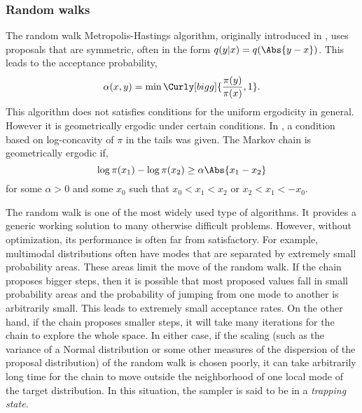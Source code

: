 \subsubsection{Random walks}
\label{ssub:Random walks}

The random walk Metropolis-Hastings algorithm, originally introduced in
\cite{Metropolis:1953ex}, uses proposals that are symmetric, often in the form
$q(y|x) = q(\Abs{y - x})$. This leads to the acceptance probability,
\begin{equation}
  \alpha(x,y) = \min\Curly[bigg]{\frac{\pi(y)}{\pi(x)},1}.
\end{equation}
This algorithm does not satisfies conditions for the uniform ergodicity in
general. However it is geometrically ergodic under certain conditions. In
\cite{Mengersen:1996th}, a condition based on log-concavity of $\pi$ in the
tails was given. The Markov chain is geometrically ergodic if,
\begin{equation}
  \log\pi(x_1) - \log\pi(x_2) \ge \alpha\Abs{x_1 - x_2}
\end{equation}
for some $\alpha > 0$ and some $x_0$ such that $x_0 < x_1 < x_2$ or $x_2 < x_1
< -x_0$.

The random walk is one of the most widely used type of \mcmc algorithms. It
provides a generic working solution to many otherwise difficult problems.
However, without optimization, its performance is often far from
satisfactory. For example, multimodal distributions often have modes that are
separated by extremely small probability areas. These areas limit the move of
the random walk. If the chain proposes bigger steps, then it is possible that
most proposed values fall in small probability areas and the probability of
jumping from one mode to another is arbitrarily small. This leads to
extremely small acceptance rates. On the other hand, if the chain proposes
smaller steps, it will take many iterations for the chain to explore the
whole space. In either case, if the scaling (such as the variance of a Normal
distribution or some other measures of the dispersion of the proposal
distribution) of the random walk is chosen poorly, it can take arbitrarily
long time for the chain to move outside the neighborhood of one local mode of
the target distribution. In this situation, the sampler is said to be in a
\emph{trapping state}.

